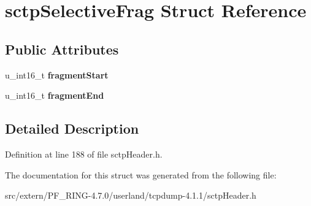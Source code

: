 \hypertarget{structsctp_selective_frag}{
\section{sctpSelectiveFrag Struct Reference}
\label{structsctp_selective_frag}
}
\subsection*{Public Attributes}
\begin{DoxyCompactItemize}
\item 
\hypertarget{structsctp_selective_frag_adcbad5f24cc4a9ef5fea63d6a6d49228}{
u\_\-int16\_\-t {\bfseries fragmentStart}}
\label{structsctp_selective_frag_adcbad5f24cc4a9ef5fea63d6a6d49228}

\item 
\hypertarget{structsctp_selective_frag_a49052a72ea746d836f18d489582ea19b}{
u\_\-int16\_\-t {\bfseries fragmentEnd}}
\label{structsctp_selective_frag_a49052a72ea746d836f18d489582ea19b}

\end{DoxyCompactItemize}


\subsection{Detailed Description}


Definition at line 188 of file sctpHeader.h.



The documentation for this struct was generated from the following file:\begin{DoxyCompactItemize}
\item 
src/extern/PF\_\-RING-\/4.7.0/userland/tcpdump-\/4.1.1/sctpHeader.h\end{DoxyCompactItemize}
